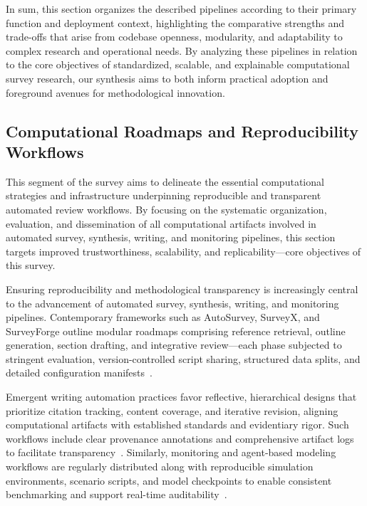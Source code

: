 \documentclass[sigconf]{acmart}
\begin{document}
In sum, this section organizes the described pipelines according to their primary function and deployment context, highlighting the comparative strengths and trade-offs that arise from codebase openness, modularity, and adaptability to complex research and operational needs. By analyzing these pipelines in relation to the core objectives of standardized, scalable, and explainable computational survey research, our synthesis aims to both inform practical adoption and foreground avenues for methodological innovation.

\subsection{Computational Roadmaps and Reproducibility Workflows}

This segment of the survey aims to delineate the essential computational strategies and infrastructure underpinning reproducible and transparent automated review workflows. By focusing on the systematic organization, evaluation, and dissemination of all computational artifacts involved in automated survey, synthesis, writing, and monitoring pipelines, this section targets improved trustworthiness, scalability, and replicability—core objectives of this survey.

Ensuring reproducibility and methodological transparency is increasingly central to the advancement of automated survey, synthesis, writing, and monitoring pipelines. Contemporary frameworks such as AutoSurvey, SurveyX, and SurveyForge outline modular roadmaps comprising reference retrieval, outline generation, section drafting, and integrative review—each phase subjected to stringent evaluation, version-controlled script sharing, structured data splits, and detailed configuration manifests~\cite{ref78,ref87,ref100,ref102,ref104,ref113,ref114,ref115}.

Emergent writing automation practices favor reflective, hierarchical designs that prioritize citation tracking, content coverage, and iterative revision, aligning computational artifacts with established standards and evidentiary rigor. Such workflows include clear provenance annotations and comprehensive artifact logs to facilitate transparency~\cite{ref78,ref87,ref91,ref92,ref98,ref100,ref102,ref105,ref112,ref113,ref114,ref115}. Similarly, monitoring and agent-based modeling workflows are regularly distributed along with reproducible simulation environments, scenario scripts, and model checkpoints to enable consistent benchmarking and support real-time auditability~\cite{ref91,ref92,ref98,ref104,ref105,ref113,ref114,ref115}.
\end{document}

